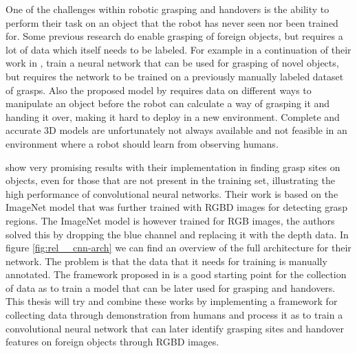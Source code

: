 One of the challenges within robotic grasping and handovers is the ability to perform their task on an object that the robot has never seen nor been trained for. Some previous research do enable grasping of foreign objects, but requires a lot of data which itself needs to be labeled. For example \textcite{Huebner2008a} in a continuation of their work in \parencite{Huebner2008}, train a neural network that can be used for grasping of novel objects, but requires the network to be trained on a previously manually labeled dataset of grasps. Also the proposed model by \parencite{Chan2014} requires data on different ways to manipulate an object before the robot can calculate a way of grasping it and handing it over, making it hard to deploy in a new environment. Complete and accurate 3D models are unfortunately not always available and not feasible in an environment where a robot should learn from observing humans.

\textcite{Redmon2014} show very promising results with their implementation in finding grasp sites on objects, even for those that are not present in the training set, illustrating the high performance of convolutional neural networks. Their work is based on the ImageNet model that was further trained with RGBD images for detecting grasp regions. The ImageNet model is however trained for RGB images, the authors solved this by dropping the blue channel and replacing it with the depth data. In figure \ref{fig:rel__cnn-arch} we can find an overview of the full architecture for their network. The problem is that the data that it needs for training is manually annotated. The framework proposed in \parencite{Chan2015a} is a good starting point for the collection of data as to train a model that can be later used for grasping and handovers. This thesis will try and combine these works by implementing a framework for collecting data through demonstration from humans and process it as to train a convolutional neural network that can later identify grasping sites and handover features on foreign objects through RGBD images.
